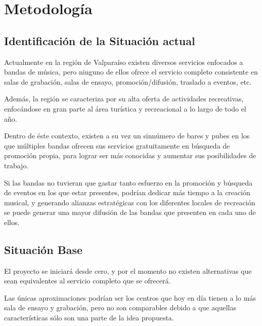 \section{Metodología}

\subsection{Identificación de la Situación actual}


Actualmente en la región de Valparaíso existen diversos servicios enfocados a
bandas de música, pero ninguno de ellos ofrece el servicio completo consistente en salas de
grabación, salas de ensayo, promoción/difusión, traslado a eventos, etc.

Además, la región se caracteriza por su alta oferta de actividades recreativas,
enfocándose en gran parte al área turística y recreacional a lo largo de todo el año.

Dentro de éste contexto, existen a su vez un sinnúmero de bares y pubes en los que
múltiples bandas ofrecen sus servicios gratuitamente en búsqueda de promoción
propia, para lograr ser más conocidas y aumentar sus posibilidades de trabajo.

Si las bandas no tuvieran que
gastar tanto esfuerzo en la promoción y búsqueda de eventos en los que estar
presentes, podrían dedicar más tiempo a la creación musical, y generando
alianzas estratégicas con los diferentes locales de recreación se puede generar
una mayor difusión de las bandas que presenten en cada uno de ellos.

\subsection{Situación Base}


El proyecto se iniciará desde cero,
y por el momento no existen alternativas que sean equivalentes al servicio completo
que se ofrecerá.

Las únicas aproximaciones podrían ser los centros que hoy en día
tienen a lo más sala de ensayo y grabación, pero no son comparables
debido a que aquellas características sólo son una parte de la idea propuesta.

